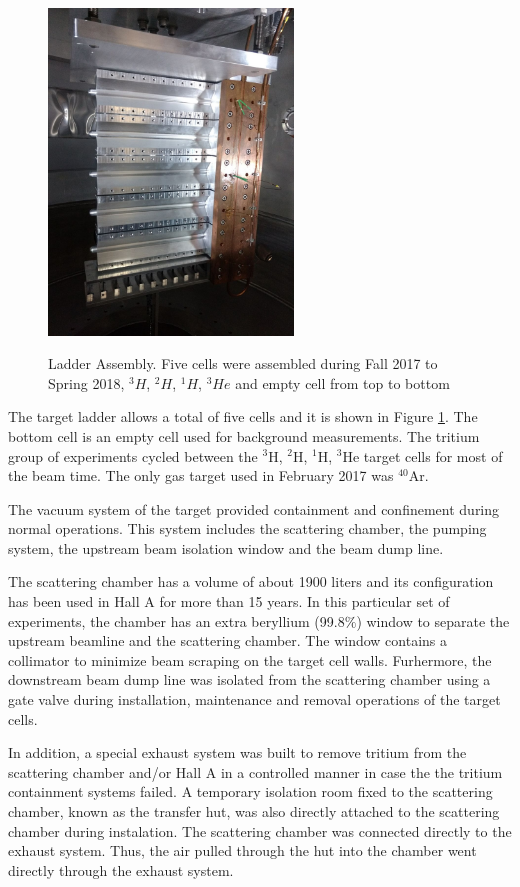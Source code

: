 \documentclass[final,5p,times,twocolumn,balance]{elsarticle}
\begin{document}
\begin{figure}[htbp]
\centering
  \includegraphics[width=6.5cm]{images/ladder.jpg}\\
  \caption{Ladder Assembly. Five cells were assembled during Fall 2017 to Spring 2018, $^{3}H$, $^{2}H$, $^{1}H $, $^{3}He$ and empty cell from top to bottom
 }\label{ladder}
\end{figure}

The target ladder allows a total of five cells and it is shown in Figure \ref{ladder}.  The bottom cell is an empty cell used for background measurements. The tritium group of experiments cycled between the $^{3}$H, $^{2}$H, $^{1}$H, $^{3}$He target cells for most of the beam time. The only gas target used in February 2017 was $^{40}$Ar.

The vacuum system of the target provided containment and confinement during normal operations. This system includes the scattering chamber, 
the pumping system, the upstream beam isolation window and the beam dump line.  

The scattering chamber has a volume of about 1900 liters and its configuration has been used in Hall A for more than 15 years. 
In this particular set of experiments, the chamber has an extra beryllium (99.8$\%$) window to separate the upstream beamline 
and the scattering chamber. The window contains a collimator to minimize beam scraping on the target cell walls. Furhermore, 
the downstream beam dump line was isolated from the scattering chamber using a gate valve during installation, maintenance and removal operations of the target cells. 

In addition, a special exhaust system was built to remove tritium from the scattering chamber and/or Hall A in a controlled manner 
in case the the tritium containment systems failed. A temporary isolation room fixed to the scattering chamber, known as 
the transfer hut, was also directly attached to the scattering chamber during instalation. The scattering chamber was connected directly to the exhaust system. Thus, the air pulled through the hut into the chamber went directly through the exhaust system.  
\end{document}
